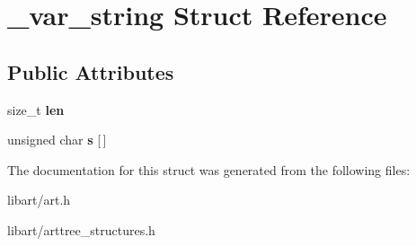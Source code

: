 \hypertarget{struct__var__string}{}\section{\+\_\+var\+\_\+string Struct Reference}
\label{struct__var__string}
\subsection*{Public Attributes}
\begin{DoxyCompactItemize}
\item 
\mbox{\label{struct__var__string_aefb53479fd422ce6cd457cf7e57eba19}} 
size\+\_\+t {\bfseries len}
\item 
\mbox{\label{struct__var__string_a112aa22cf4b6eea009bb02a1d5e8b6a1}} 
unsigned char {\bfseries s} \mbox{[}$\,$\mbox{]}
\end{DoxyCompactItemize}


The documentation for this struct was generated from the following files\+:\begin{DoxyCompactItemize}
\item 
libart/art.\+h\item 
libart/arttree\+\_\+structures.\+h\end{DoxyCompactItemize}
